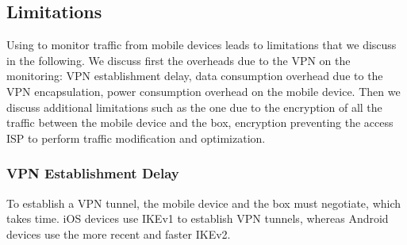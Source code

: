 



\subsection{Limitations}
Using \platname{} to monitor traffic from mobile devices leads to
limitations that we discuss in the following. We discuss first the
overheads due to the VPN on the monitoring: VPN establishment delay,
data consumption overhead due to the VPN encapsulation, power
consumption overhead on the mobile device. Then we discuss additional
limitations such as the one due to the encryption of all the traffic
between the mobile device and the \platname{} box, encryption
preventing the access ISP to perform traffic modification and
optimization. 

\subsubsection{VPN Establishment Delay}
To establish a VPN tunnel, the mobile device and the \platname{} box
must negotiate, which takes time. iOS devices use IKEv1 to establish VPN
tunnels, whereas Android devices use the more recent and faster IKEv2.


